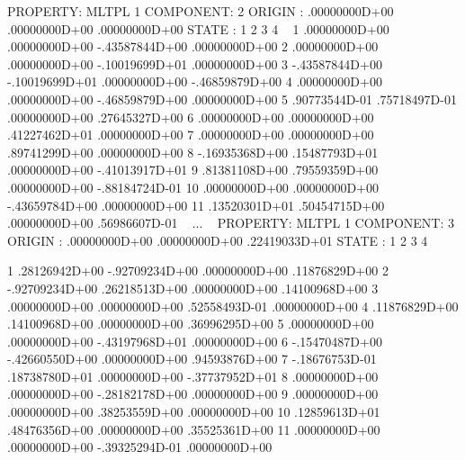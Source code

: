 \begin{sourcelisting}
 PROPERTY: MLTPL  1   COMPONENT:   2
 ORIGIN    :  .00000000D+00  .00000000D+00  .00000000D+00
 STATE     :       1              2              3              4
~
     1        .00000000D+00  .00000000D+00 -.43587844D+00  .00000000D+00
     2        .00000000D+00  .00000000D+00 -.10019699D+01  .00000000D+00
     3       -.43587844D+00 -.10019699D+01  .00000000D+00 -.46859879D+00
     4        .00000000D+00  .00000000D+00 -.46859879D+00  .00000000D+00
     5        .90773544D-01  .75718497D-01  .00000000D+00  .27645327D+00
     6        .00000000D+00  .00000000D+00  .41227462D+01  .00000000D+00
     7        .00000000D+00  .00000000D+00  .89741299D+00  .00000000D+00
     8       -.16935368D+00  .15487793D+01  .00000000D+00 -.41013917D+01
     9        .81381108D+00  .79559359D+00  .00000000D+00 -.88184724D-01
    10        .00000000D+00  .00000000D+00 -.43659784D+00  .00000000D+00
    11        .13520301D+01  .50454715D+00  .00000000D+00  .56986607D-01
~
...
~
 PROPERTY: MLTPL  1   COMPONENT:   3
 ORIGIN    :  .00000000D+00  .00000000D+00  .22419033D+01
 STATE     :       1              2              3              4

     1        .28126942D+00 -.92709234D+00  .00000000D+00  .11876829D+00
     2       -.92709234D+00  .26218513D+00  .00000000D+00  .14100968D+00
     3        .00000000D+00  .00000000D+00  .52558493D-01  .00000000D+00
     4        .11876829D+00  .14100968D+00  .00000000D+00  .36996295D+00
     5        .00000000D+00  .00000000D+00 -.43197968D+01  .00000000D+00
     6       -.15470487D+00 -.42660550D+00  .00000000D+00  .94593876D+00
     7       -.18676753D-01  .18738780D+01  .00000000D+00 -.37737952D+01
     8        .00000000D+00  .00000000D+00 -.28182178D+00  .00000000D+00
     9        .00000000D+00  .00000000D+00  .38253559D+00  .00000000D+00
    10        .12859613D+01  .48476356D+00  .00000000D+00  .35525361D+00
    11        .00000000D+00  .00000000D+00 -.39325294D-01  .00000000D+00
\end{sourcelisting}


